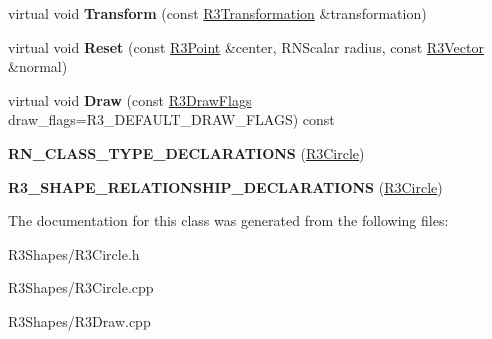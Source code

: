 \begin{DoxyCompactItemize}
\item 
virtual void {\bfseries Transform} (const \hyperlink{class_r3_transformation}{R3\+Transformation} \&transformation)\hypertarget{class_r3_circle_a671288dddab40c6a2979a3d353a5c765}{}\label{class_r3_circle_a671288dddab40c6a2979a3d353a5c765}

\item 
virtual void {\bfseries Reset} (const \hyperlink{class_r3_point}{R3\+Point} \&center, R\+N\+Scalar radius, const \hyperlink{class_r3_vector}{R3\+Vector} \&normal)\hypertarget{class_r3_circle_ad811dafa549bbf0ca148093ae7bbb2c2}{}\label{class_r3_circle_ad811dafa549bbf0ca148093ae7bbb2c2}

\item 
virtual void {\bfseries Draw} (const \hyperlink{class_r_n_flags}{R3\+Draw\+Flags} draw\+\_\+flags=R3\+\_\+\+D\+E\+F\+A\+U\+L\+T\+\_\+\+D\+R\+A\+W\+\_\+\+F\+L\+A\+GS) const \hypertarget{class_r3_circle_a64fb044e0d73c78d6c050041492fad20}{}\label{class_r3_circle_a64fb044e0d73c78d6c050041492fad20}

\item 
{\bfseries R\+N\+\_\+\+C\+L\+A\+S\+S\+\_\+\+T\+Y\+P\+E\+\_\+\+D\+E\+C\+L\+A\+R\+A\+T\+I\+O\+NS} (\hyperlink{class_r3_circle}{R3\+Circle})\hypertarget{class_r3_circle_a9d06d7dfa161cc4b6db0b699208eb1ff}{}\label{class_r3_circle_a9d06d7dfa161cc4b6db0b699208eb1ff}

\item 
{\bfseries R3\+\_\+\+S\+H\+A\+P\+E\+\_\+\+R\+E\+L\+A\+T\+I\+O\+N\+S\+H\+I\+P\+\_\+\+D\+E\+C\+L\+A\+R\+A\+T\+I\+O\+NS} (\hyperlink{class_r3_circle}{R3\+Circle})\hypertarget{class_r3_circle_afb5a6ff45c7e9b86ab97be6bc1831a78}{}\label{class_r3_circle_afb5a6ff45c7e9b86ab97be6bc1831a78}

\end{DoxyCompactItemize}


The documentation for this class was generated from the following files\+:\begin{DoxyCompactItemize}
\item 
R3\+Shapes/R3\+Circle.\+h\item 
R3\+Shapes/R3\+Circle.\+cpp\item 
R3\+Shapes/R3\+Draw.\+cpp\end{DoxyCompactItemize}
